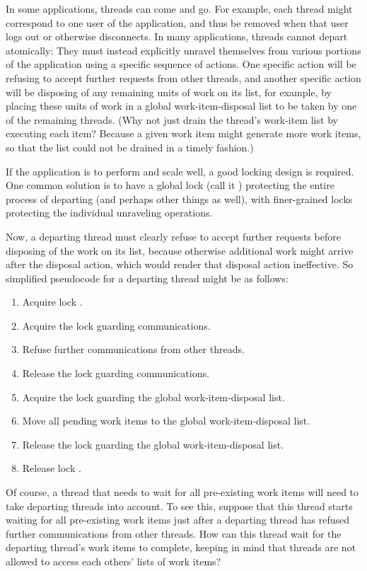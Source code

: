 \begin{enumerate}
	In some applications, threads can come and go.
	For example, each thread might correspond to one user of the
	application, and thus be removed when that user logs out or
	otherwise disconnects.
	In many applications, threads cannot depart atomically: They must
	instead explicitly unravel themselves from various portions of
	the application using a specific sequence of actions.
	One specific action will be refusing to accept further requests
	from other threads, and another specific action will be disposing
	of any remaining units of work on its list, for example, by
	placing these units of work in a global work-item-disposal list
	to be taken by one of the remaining threads.
	(Why not just drain the thread's work-item list by executing
	each item?
	Because a given work item might generate more work items, so
	that the list could not be drained in a timely fashion.)

	If the application is to perform and scale well, a good locking
	design is required.
	One common solution is to have a global lock (call it )
	protecting the entire
	process of departing (and perhaps other things as well),
	with finer-grained locks protecting the
	individual unraveling operations.

	Now, a departing thread must clearly refuse to accept further
	requests before disposing of the work on its list, because
	otherwise additional work might arrive after the disposal action,
	which would render that disposal action ineffective.
	So simplified pseudocode for a departing thread might be as follows:

	\begin{enumerate}
	\item	Acquire lock .
	\item	Acquire the lock guarding communications.
	\item	Refuse further communications from other threads.
	\item	Release the lock guarding communications.
	\item	Acquire the lock guarding the global work-item-disposal list.
	\item	Move all pending work items to the global
		work-item-disposal list.
	\item	Release the lock guarding the global work-item-disposal list.
	\item	Release lock .
	\end{enumerate}

	Of course, a thread that needs to wait for all pre-existing work
	items will need to take departing threads into account.
	To see this, suppose that this thread starts waiting for all
	pre-existing work items just after a departing thread has refused
	further communications from other threads.
	How can this thread wait for the departing thread's work items
	to complete, keeping in mind that threads are not allowed to
	access each others' lists of work items?


\end{enumerate}
